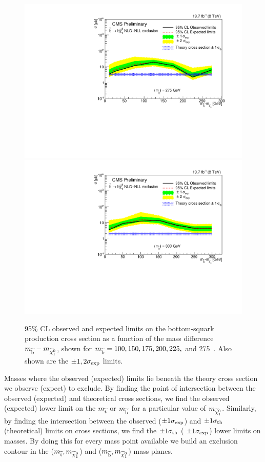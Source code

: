 \begin{figure}[!Hhtb]
\begin{center}
  \includegraphics[scale=0.39]{Figures/sus13009/limitplots/plots/sbottom/Limit_DM_sbottom_275.pdf}
    \includegraphics[scale=0.39]{Figures/sus13009/limitplots/plots/sbottom/Limit_DM_sbottom_300.pdf}
  \caption{95\% CL observed and expected limits on the bottom-squark production cross section as a function of the mass difference $m_{\widetilde{{\rm b}}} - m_{\widetilde{\chi}^{0}_{1}}$, shown for $m_{\widetilde{{\rm b}}} = 100, 150, 175, 200, 225,$ and 275~\GeV. 
  Also shown are the $\pm 1, 2 \sigma_{\rm exp}$ limits. 
 }
  \label{fig:sbottom_limits}
  \end{center}
\end{figure}




Masses where the observed (expected) limits lie beneath the theory cross section we observe (expect) to exclude.
By finding the point of intersection between the observed (expected) and theoretical cross sections, we find the observed (expected) lower limit on the $m_{\widetilde{{\rm t}}}$ or $m_{\widetilde{{\rm b}}}$ for a particular value of $m_{\widetilde{\chi}^{0}_{1}}$.
Similarly, by finding the intersection between the observed ($\pm 1 \sigma_{\rm exp}$) and $\pm 1 \sigma_{\rm th}$ (theoretical) limits on cross sections, we find the $\pm 1 \sigma_{\rm th}$ ( $\pm 1  \sigma_{\rm exp}$) lower limits on masses.
By doing this for every mass point available we build an exclusion contour in the ($m_{\widetilde{{\rm t}}},m_{\widetilde{\chi}^{0}_{1}}$) and ($m_{\widetilde{{\rm b}}},m_{\widetilde{\chi}^{0}_{1}}$) mass planes.

